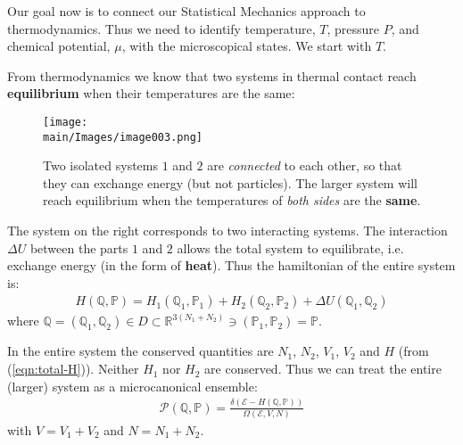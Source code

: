 \documentclass[../../main.tex]{subfiles}
\begin{document}
\medskip

Our goal now is to connect our Statistical Mechanics approach to thermodynamics. Thus we need to identify temperature, $T$, pressure $P$, and chemical potential, $\mu$, with the microscopical states. We start with $T$.

\medskip

From thermodynamics we know that two systems in thermal contact reach \textbf{equilibrium} when their temperatures are the same: 

\begin{figure}[htp]
    \centering
    \texttt{[image: \\main/Images/image003.png]}
    \caption{Two isolated systems $1$ and $2$ are \textit{connected} to each other, so that they can exchange energy (but not particles). The larger system will reach equilibrium when the temperatures of \textit{both sides} are the \textbf{same}.\label{fig:thermal-equilibrium}}
\end{figure}

The system on the right corresponds to two interacting systems. The interaction $\Delta U$ between the parts $1$ and $2$ allows the total system to equilibrate, i.e. exchange energy (in the form of \textbf{heat}). Thus the hamiltonian of the entire system is:
\begin{align}\label{eqn:total-H}
    H(\mathbb{Q},\mathbb{P}) = H_1(\mathbb{Q}_1, \mathbb{P}_1) + H_2(\mathbb{Q}_2, \mathbb{P}_2) + \Delta U(\mathbb{Q}_1, \mathbb{Q}_2)
\end{align}
where $\mathbb{Q} = (\mathbb{Q}_1, \mathbb{Q}_2) \in D \subset \mathbb{R}^{3(N_1+N_2)} \ni (\mathbb{P}_1, \mathbb{P}_2) = \mathbb{P}$.

\medskip

In the entire system the conserved quantities are $N_1$, $N_2$, $V_1$, $V_2$ and $H$ (from (\ref{eqn:total-H})). Neither $H_1$ nor $H_2$ are conserved. Thus we can treat the entire (larger) system as a microcanonical ensemble:
\begin{align*}
    \mathcal{P}(\mathbb{Q},\mathbb{P}) = \frac{\delta (\mathcal{E}-H(\mathbb{Q},\mathbb{P}))}{\Omega (\mathcal{E}, V, N)} 
\end{align*}
with $V=V_1 + V_2$ and $N=N_1+N_2$.
\end{document}
